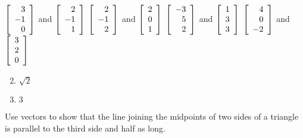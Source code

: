 \begin{multicols}{2}
\begin{ex}
\begin{exenumerate}[column-sep=-15pt]
\exitem $\left[
\begin{array}{r}
3 \\
-1 \\
0
\end{array}
\right]$
and
$\left[
\begin{array}{r}
2\\
-1 \\
1
\end{array}
\right]$
\exitem $\left[
\begin{array}{r}
2 \\
-1 \\
2
\end{array}
\right]$
and
$\left[
\begin{array}{r}
2\\
0 \\
1
\end{array}
\right]$
\exitem $\left[
\begin{array}{r}
-3 \\
5 \\
2
\end{array}
\right]$
and
$\left[
\begin{array}{r}
1\\
3 \\
3
\end{array}
\right]$
\exitem $\left[
\begin{array}{r}
4 \\
0 \\
-2
\end{array}
\right]$
and
$\left[
\begin{array}{r}
3\\
2 \\
0
\end{array}
\right]$
\end{exenumerate}
\begin{sol}
\begin{enumerate}[label={\alph*.}]
\setcounter{enumi}{1}
\item 
$\sqrt{2}$

\setcounter{enumi}{3}
\item  $3$

\end{enumerate}
\end{sol}
\end{ex}

\begin{ex}
Use
 vectors to show that the line joining the midpoints of two sides of a 
triangle is parallel to the third side and half as long.
\end{ex}


\end{multicols}
